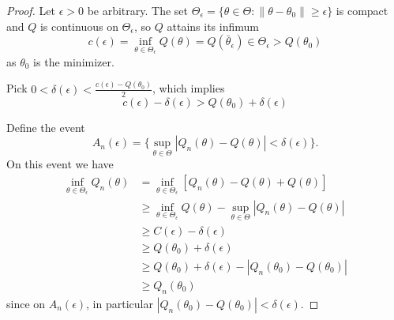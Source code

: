 \begin{proof}
  Let $\epsilon > 0$ be arbitrary. The set $\Theta_{\epsilon} = \{
  \theta \in \Theta : \| \theta - \theta_{0} \| \geq \epsilon \}$ is
  compact and $Q$ is continuous on $\Theta_{\epsilon}$, so $Q$ attains
  its infimum
  \begin{equation}
    \label{eq:33}
    c(\epsilon) = \inf_{\theta \in \Theta_{\epsilon}} Q(\theta) =
    Q(\bar \theta_{\epsilon}) \in \Theta_{\epsilon} > Q(\theta_{0})
  \end{equation} as $\theta_{0}$ is the minimizer.

  Pick $0 < \delta(\epsilon) < \frac{c(\epsilon) - Q(\theta_{0})}{2}$,
  which implies
  \begin{equation}
    \label{eq:34}
    c(\epsilon) - \delta(\epsilon) > Q(\theta_{0}) + \delta(\epsilon)
  \end{equation}

  Define the event
  \begin{equation}
    \label{eq:35}
    A_{n}(\epsilon) = \{ \sup_{\theta \in \Theta} |Q_{n}(\theta) -
    Q(\theta)| < \delta(\epsilon) \}.
  \end{equation}  On this event we have
  \begin{align*}
    \inf_{\theta \in \Theta_{\epsilon}} Q_{n}(\theta) & = \inf_{\theta
      \in \Theta_{\epsilon}} [Q_{n}(\theta) - Q(\theta) + Q(\theta)]
                                                                                              \\
                                                      & \geq \inf_{\theta \in \Theta_{\epsilon}} Q(\theta) - \sup_{\theta
      \in \Theta} |Q_{n}(\theta) - Q(\theta)|                                                 \\
                                                      & \geq C(\epsilon) - \delta(\epsilon)   \\
                                                      & \geq Q(\theta_{0}) + \delta(\epsilon) \\
                                                      & \geq Q(\theta_{0}) + \delta(\epsilon) - |Q_{n}(\theta_{0}) -
    Q(\theta_{0})|                                                                            \\
                                                      & \geq Q_{n}(\theta_{0})
  \end{align*} since on $A_{n}(\epsilon)$, in particular
  $|Q_{n}(\theta_{0}) - Q(\theta_{0})| < \delta(\epsilon)$.


\end{proof}
